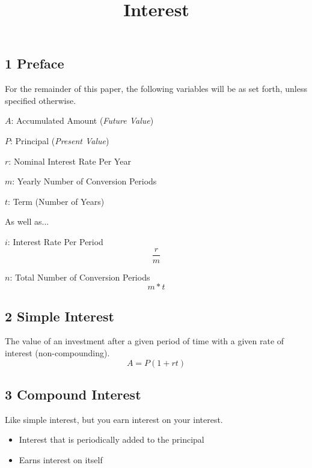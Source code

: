 \documentclass[twocolumn]{article}
\title{Interest}
\author{}
\date{}
\newenvironment{adescription}[1]
{\begin{list}{}%
	{\renewcommand\makelabel[1]{##1\hfill}%
		\settowidth\labelwidth{\makelabel{#1}}%
		\setlength\leftmargin{\labelwidth}
		\addtolength\leftmargin{\labelsep}}}
{\end{list}}
\newcommand{\dquad}{\quad{}\quad{}}
\begin{document}
	\maketitle{}

	\subsection*{1 Preface}
	\quad{}For the remainder of this paper, the following variables will be as set forth, unless specified otherwise.
	
	\begin{adescription}{\quad{}$m$:}
		\item[\dquad{}$A$:] Accumulated Amount (\emph{Future Value})
		\item[\dquad{}$P$:] Principal (\emph{Present Value})
		\item[\dquad{}$r$:] Nominal Interest Rate Per Year
		\item[\dquad{}$m$:] Yearly Number of Conversion Periods
		\item[\dquad{}$t$:] Term (Number of Years)
		\item[\quad{}As well as...]
		\item[\dquad{}$i$:] Interest Rate Per Period
		\begin{equation}
			\frac{r}{m}
		\end{equation}
		\item[\dquad{}$n$:] Total Number of Conversion Periods
		\begin{equation}
			m * t
		\end{equation}
	\end{adescription}
	
	\subsection*{2 Simple Interest}
	The value of an investment after a given period of time with a given rate of interest (non-compounding).
	\begin{equation}
		A = P(1 + rt)
	\end{equation}
	
	\subsection*{3 Compound Interest} 
	Like simple interest, but you earn interest on your interest.
	\begin{itemize}[label=--]
		\item Interest that is periodically added to the principal
		\item Earns interest on itself
	\end{itemize}
	
\end{document}

